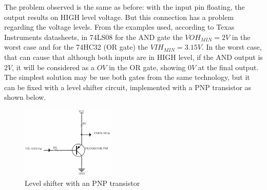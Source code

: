 The problem observed is the same as before: with the input pin floating, the output results on HIGH
level voltage. But this connection has a problem regarding the voltage levels. From the examples used, 
according to Texas Instruments datasheets, 
in 74LS08 for the AND gate the $VOH_{MIN}=2V$ in the worst case and for the 74HC32 (OR gate) the $VIH_{MIN}=3.15V$.
In the worst case, that can cause that although both inputs are in HIGH level, if the AND output is $2V$, 
it will be considered as a $OV$ in the OR gate, showing $0V$ at the final output.
\newpage
The simplest solution may be use both gates from the same technology, but it can be fixed with a 
level shifter circuit, implemented with a PNP transistor as shown below.

\begin{figure}[H]
    \begin{centering}
    \includegraphics[width=0.4\textwidth]{data/MIXFIX_EJ5}
    \par\end{centering}
    \caption{Level shifter with an PNP transistor}
\end{figure}